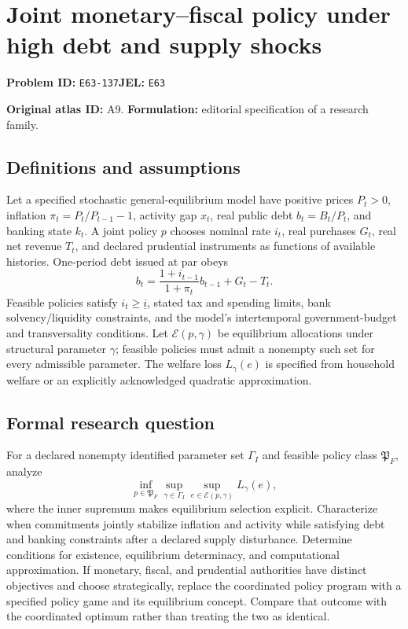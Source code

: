 \documentclass[11pt,a4paper]{article}
\begin{document}
\section*{Joint monetary–fiscal policy under high debt and supply shocks}
\textbf{Problem ID:} \texttt{E63-137}\quad \textbf{JEL:} \texttt{E63}\par
\label{problem:OP-0019}
\label{atlas:prob:A9}

\noindent\textbf{Original atlas ID:} A9. \textbf{Formulation:} editorial specification of a research family.

\subsection*{Definitions and assumptions}

Let a specified stochastic general-equilibrium model have positive prices $P_t>0$, inflation $\pi_t=P_t/P_{t-1}-1$, activity gap $x_t$, real public debt $b_t=B_t/P_t$, and banking state $k_t$. A joint policy $p$ chooses nominal rate $i_t$, real purchases $G_t$, real net revenue $T_t$, and declared prudential instruments as functions of available histories. One-period debt issued at par obeys
\[
b_t=\frac{1+i_{t-1}}{1+\pi_t}b_{t-1}+G_t-T_t.
\]
Feasible policies satisfy $i_t\ge\underline i$, stated tax and spending limits, bank solvency/liquidity constraints, and the model's intertemporal government-budget and transversality conditions. Let $\mathcal E(p,\gamma)$ be equilibrium allocations under structural parameter $\gamma$; feasible policies must admit a nonempty such set for every admissible parameter. The welfare loss $L_\gamma(e)$ is specified from household welfare or an explicitly acknowledged quadratic approximation.

\subsection*{Formal research question}

For a declared nonempty identified parameter set $\Gamma_I$ and feasible policy class $\mathfrak P_F$, analyze
\[
\inf_{p\in\mathfrak P_F}\sup_{\gamma\in\Gamma_I}
 \sup_{e\in\mathcal E(p,\gamma)}L_\gamma(e),
\]
where the inner supremum makes equilibrium selection explicit. Characterize when commitments jointly stabilize inflation and activity while satisfying debt and banking constraints after a declared supply disturbance. Determine conditions for existence, equilibrium determinacy, and computational approximation. If monetary, fiscal, and prudential authorities have distinct objectives and choose strategically, replace the coordinated policy program with a specified policy game and its equilibrium concept. Compare that outcome with the coordinated optimum rather than treating the two as identical.
\end{document}
